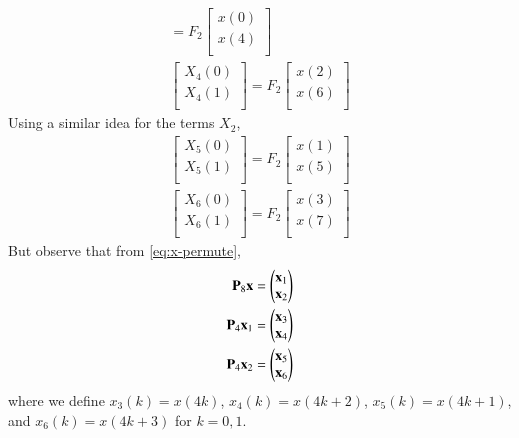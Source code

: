 \documentclass[journal,12pt,twocolumn]{IEEEtran}
\let\vec\mathbf
\renewcommand\thesection{\arabic{section}}
\begin{document}
\begin{enumerate}[label=\thesection.\arabic*]
\begin{align}
= F_{2}
\begin{bmatrix}
x(0) \\ 
x(4) \\ 
\end{bmatrix} \\
\begin{bmatrix}
X_{4}(0) \\ 
X_{4}(1)\\ 
\end{bmatrix}
= F_{2}
\begin{bmatrix}
x(2) \\ 
x(6) \\ 
\end{bmatrix}
\end{align}
Using a similar idea for the terms $X_2$, 
\begin{align}
\begin{bmatrix}
X_{5}(0) \\ 
X_{5}(1)\\ 
\end{bmatrix}
= F_{2}
\begin{bmatrix}
x(1) \\ 
x(5) \\ 
\end{bmatrix} \\
\begin{bmatrix}
X_{6}(0) \\ 
X_{6}(1)\\ 
\end{bmatrix}
= F_{2}
\begin{bmatrix}
x(3) \\ 
x(7) \\ 
\end{bmatrix}
\end{align}
But observe that from \eqref{eq:x-permute},
\begin{align}
	\vec{P}_8\vec{x} &= \myvec{\vec{x}_1\\\vec{x}_2} \\
	\vec{P}_4\vec{x}_1 &= \myvec{\vec{x}_3\\\vec{x}_4} \\ 
	\vec{P}_4\vec{x}_2 &= \myvec{\vec{x}_5\\\vec{x}_6}
\end{align}
where we define $x_3(k) = x(4k)$, $x_4(k) = x(4k + 2)$, $x_5(k) = x(4k + 1)$, and $x_6(k) = x(4k + 3)$ for $k = 0, 1$.


\end{enumerate}
\end{document}

